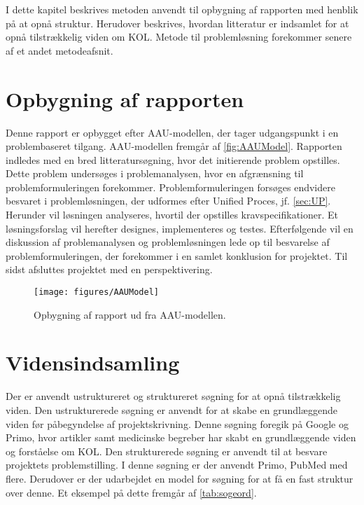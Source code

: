 I dette kapitel beskrives metoden anvendt til opbygning af rapporten med henblik på at opnå struktur. Herudover beskrives, hvordan litteratur er indsamlet for at opnå tilstrækkelig viden om KOL. Metode til problemløsning forekommer senere af et andet metodeafsnit.

\section{Opbygning af rapporten}
Denne rapport er opbygget efter AAU-modellen, der tager udgangspunkt i en problembaseret tilgang. AAU-modellen fremgår af \autoref{fig:AAUModel}. Rapporten indledes med en bred litteratursøgning, hvor det initierende problem opstilles. Dette problem undersøges i problemanalysen, hvor en afgrænsning til problemformuleringen forekommer. Problemformuleringen forsøges endvidere besvaret i problemløsningen, der udformes efter Unified Proces, jf. \autoref{sec:UP}. Herunder vil løsningen analyseres, hvortil der opstilles kravspecifikationer. Et løsningsforslag vil herefter designes, implementeres og testes. Efterfølgende vil en diskussion af problemanalysen og problemløsningen lede op til besvarelse af problemformuleringen, der forekommer i en samlet konklusion for projektet. Til sidst afsluttes projektet med en perspektivering.

\begin{figure} [H]
\centering
\texttt{[image: figures/AAUModel]}
\caption{Opbygning af rapport ud fra AAU-modellen.}
\label{fig:AAUModel}
\end{figure} 

\section{Vidensindsamling}
Der er anvendt ustruktureret og struktureret søgning for at opnå tilstrækkelig viden. Den ustrukturerede søgning er anvendt for at skabe en grundlæggende viden før påbegyndelse af projektskrivning. Denne søgning foregik på Google og Primo, hvor artikler samt medicinske begreber har skabt en grundlæggende viden og forståelse om KOL. Den strukturerede søgning er anvendt til at besvare projektets problemstilling. I denne søgning er der anvendt Primo, PubMed med flere. Derudover er der udarbejdet en model for søgning for at få en fast struktur over denne. Et eksempel på dette fremgår af \autoref{tab:sogeord}.

